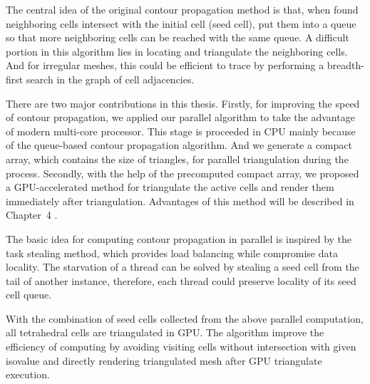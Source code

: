 \documentclass[11pt, b5paper]{report}
\begin{document}
The central idea of the original contour propagation method is that, when 
found neighboring cells
intersect with the initial cell (seed cell), put them into a queue so that
more neighboring cells can be reached with the same queue. A difficult portion
in this algorithm lies in locating and triangulate the neighboring cells.
And for irregular meshes, this could be efficient to trace by performing
a breadth-first search in the graph of cell adjacencies.



There are two major contributions in this thesis. Firstly, for improving the 
speed of contour propagation, we applied our parallel algorithm to take the
advantage of modern multi-core processor. This stage is proceeded in CPU mainly
because of the queue-based contour propagation algorithm. And we generate 
a compact array, which contains the size of triangles, for parallel 
triangulation during the process. Secondly, with the help of the precomputed
compact array, we proposed a GPU-accelerated method for triangulate the active
cells and render them immediately after triangulation. Advantages of this 
method will be described in Chapter~4%
.

The basic idea for computing contour propagation in parallel is inspired
by the task stealing method\cite{pal1994parallel}, which provides load 
balancing while compromise data locality. The starvation of a thread can
be solved by stealing a seed cell from the tail of another instance, 
therefore, each thread could preserve locality of its seed cell queue.

With the combination of seed cells collected from the above parallel 
computation, all tetrahedral cells are triangulated in GPU. 
The algorithm improve the efficiency of computing by avoiding visiting
cells without intersection with given isovalue and directly rendering
triangulated mesh after GPU triangulate execution.


\end{document}
